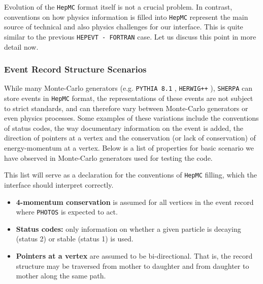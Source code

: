 \documentclass[]{Photos_interface_design}
\begin{document}
Evolution of the {\tt HepMC} format itself is not a crucial problem.
In contrast, conventions on how physics information is  filled into {\tt HepMC}
represent the main source of technical and also physics 
challenges for our interface. 
This is quite similar to the previous
{\tt HEPEVT - FORTRAN} case. Let us discuss this point in more detail now.

\subsubsection{Event Record Structure Scenarios}



While many Monte-Carlo generators (e.g. {\tt PYTHIA 8.1} \cite{Sjostrand:2007gs}, 
{\tt HERWIG++} \cite{Bahr:2008pv}), {\tt SHERPA} \cite{Gleisberg:2008ta} can 
store events in {\tt HepMC} format, the  representations of
these events are not subject to strict standards,  and can therefore
vary between Monte-Carlo generators or even physics processes. Some examples
of these variations include the conventions of status codes, the  way
documentary information on the event is added, the direction of pointers at a vertex
and the conservation (or lack of conservation) of energy-momentum at a vertex.
Below is a list of properties for basic scenario we have observed in Monte-Carlo
generators used for testing the code.

This list will serve as a declaration for the conventions of  {\tt HepMC} filling, which  the 
interface should interpret correctly.

\begin{itemize}
  \item \textbf{4-momentum conservation} is assumed for all vertices in the event record where {\tt PHOTOS} is expected to act.
  \item \textbf{Status codes:} only information on whether a given particle is decaying (status 2) or stable (status 1) is used.
  \item \textbf{Pointers at a vertex} are assumed to be bi-directional. 
    That is, the record structure may be traversed from mother to daughter 
    and from daughter to mother along the same path.
\end{itemize}
\end{document}
